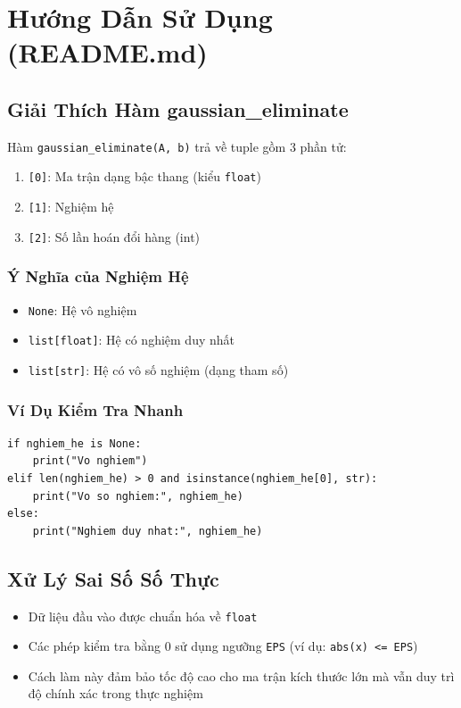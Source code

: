 \documentclass[12pt, a4paper, twoside]{article}
\begin{document}
\section{Hướng Dẫn Sử Dụng (README.md)}

\subsection{Giải Thích Hàm gaussian\_eliminate}

Hàm \texttt{gaussian\_eliminate(A, b)} trả về tuple gồm 3 phần tử:

\begin{enumerate}
    \item \texttt{[0]}: Ma trận dạng bậc thang (kiểu \texttt{float})
    \item \texttt{[1]}: Nghiệm hệ
    \item \texttt{[2]}: Số lần hoán đổi hàng (int)
\end{enumerate}

\subsubsection{Ý Nghĩa của Nghiệm Hệ}

\begin{itemize}
    \item \texttt{None}: Hệ vô nghiệm
    \item \texttt{list[float]}: Hệ có nghiệm duy nhất
    \item \texttt{list[str]}: Hệ có vô số nghiệm (dạng tham số)
\end{itemize}

\subsubsection{Ví Dụ Kiểm Tra Nhanh}

\begin{lstlisting}
if nghiem_he is None:
    print("Vo nghiem")
elif len(nghiem_he) > 0 and isinstance(nghiem_he[0], str):
    print("Vo so nghiem:", nghiem_he)
else:
    print("Nghiem duy nhat:", nghiem_he)
\end{lstlisting}

\subsection{Xử Lý Sai Số Số Thực}

\begin{itemize}
    \item Dữ liệu đầu vào được chuẩn hóa về \texttt{float}
    \item Các phép kiểm tra bằng 0 sử dụng ngưỡng \texttt{EPS} (ví dụ: \texttt{abs(x) <= EPS})
    \item Cách làm này đảm bảo tốc độ cao cho ma trận kích thước lớn mà vẫn duy trì độ chính xác trong thực nghiệm
\end{itemize}
\end{document}
